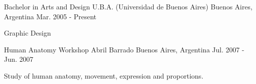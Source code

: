

\begin{cventries}

  \cventry
    {Bachelor in Arts and Design} %
    {U.B.A. (Universidad de Buenos Aires)} %
    {Buenos Aires, Argentina} %
    {Mar. 2005 - Present} %
    {
      \begin{cvitems}
        Graphic Design
      \end{cvitems}
    }

  \cventry
    {Human Anatomy Workshop} %
    {Abril Barrado} %
    {Buenos Aires, Argentina} %
    {Jul. 2007 - Jun. 2007} %
    {
      \begin{cvitems}
        Study of human anatomy, movement, expression and proportions.
      \end{cvitems}
    }



\end{cventries}



